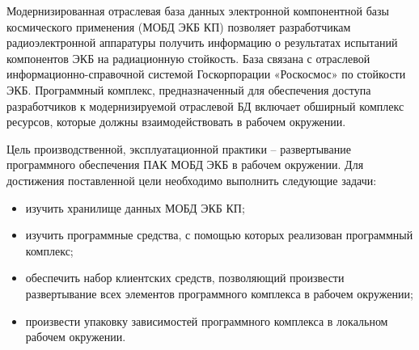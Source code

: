 \setcounter{page}{2}

Модернизированная отраслевая база данных электронной компонентной базы космического применения (МОБД ЭКБ КП) позволяет разработчикам радиоэлектронной аппаратуры получить информацию о результатах испытаний компонентов ЭКБ на радиационную стойкость. База связана с отраслевой информационно-справочной системой Госкорпорации «Роскосмос» по стойкости ЭКБ. Программный комплекс, предназначенный для обеспечения доступа разработчиков к модернизируемой отраслевой БД включает обширный комплекс ресурсов, которые должны взаимодействовать в рабочем окружении. 

Цель производственной, эксплуатационной практики -- развертывание программного обеспечения ПАК МОБД ЭКБ в рабочем окружении. Для достижения поставленной цели необходимо выполнить следующие задачи:
\begin{itemize}
	\item изучить хранилище данных МОБД ЭКБ КП;
	\item изучить программные средства, с помощью которых реализован программный комплекс;
	\item обеспечить набор клиентских средств, позволяющий произвести развертывание всех элементов программного комплекса в рабочем окружении;
	\item произвести упаковку зависимостей программного комплекса в локальном рабочем окружении.
\end{itemize}